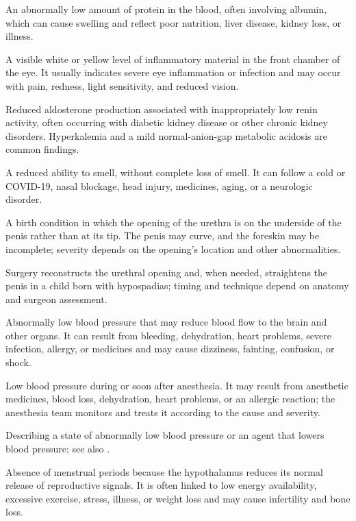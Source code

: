  An abnormally low amount of protein in the blood, often involving albumin, which can cause swelling and reflect poor nutrition, liver disease, kidney loss, or illness.

 A visible white or yellow level of inflammatory material in the front chamber of the eye. It usually indicates severe eye inflammation or infection and may occur with pain, redness, light sensitivity, and reduced vision.

 Reduced aldosterone production associated with inappropriately low renin activity, often occurring with diabetic kidney disease or other chronic kidney disorders. Hyperkalemia and a mild normal-anion-gap metabolic acidosis are common findings.

 A reduced ability to smell, without complete loss of smell. It can follow a cold or COVID-19, nasal blockage, head injury, medicines, aging, or a neurologic disorder.

 A birth condition in which the opening of the urethra is on the underside of the penis rather than at its tip. The penis may curve, and the foreskin may be incomplete; severity depends on the opening’s location and other abnormalities.

 Surgery reconstructs the urethral opening and, when needed, straightens the penis in a child born with hypospadias; timing and technique depend on anatomy and surgeon assessment.

 Abnormally low blood pressure that may reduce blood flow to the brain and other organs. It can result from bleeding, dehydration, heart problems, severe infection, allergy, or medicines and may cause dizziness, fainting, confusion, or shock.

 Low blood pressure during or soon after anesthesia. It may result from anesthetic medicines, blood loss, dehydration, heart problems, or an allergic reaction; the anesthesia team monitors and treats it according to the cause and severity.

 Describing a state of abnormally low blood pressure or an agent that lowers blood pressure; see also .

 Absence of menstrual periods because the hypothalamus reduces its normal release of reproductive signals. It is often linked to low energy availability, excessive exercise, stress, illness, or weight loss and may cause infertility and bone loss.

